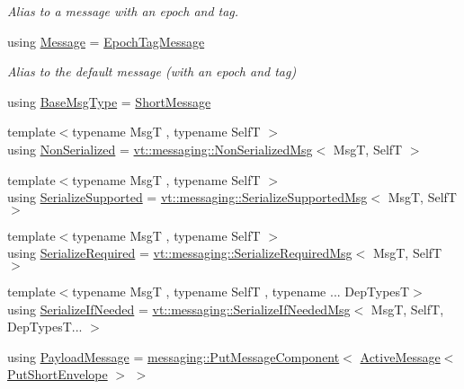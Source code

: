 \begin{DoxyCompactItemize}
\begin{DoxyCompactList}\small\item\em Alias to a message with an epoch and tag. \end{DoxyCompactList}\item 
using \hyperlink{namespacevt_a3a3ddfef40b4c90915fa43cdd5f129ea}{Message} = \hyperlink{namespacevt_a4ccc13b06bff8a4a35426a1a082a95a9}{Epoch\+Tag\+Message}
\begin{DoxyCompactList}\small\item\em Alias to the default message (with an epoch and tag) \end{DoxyCompactList}\item 
using \hyperlink{namespacevt_a44d0d4e144748f2b19a1cfd962f50338}{Base\+Msg\+Type} = \hyperlink{namespacevt_a1125ac1da6c0bbf141e0ea0739d7602d}{Short\+Message}
\item 
{\footnotesize template$<$typename MsgT , typename SelfT $>$ }\\using \hyperlink{namespacevt_a378e4a02213923b4ba1c3f9d2a1424c7}{Non\+Serialized} = \hyperlink{structvt_1_1messaging_1_1_non_serialized_msg}{vt\+::messaging\+::\+Non\+Serialized\+Msg}$<$ MsgT, SelfT $>$
\item 
{\footnotesize template$<$typename MsgT , typename SelfT $>$ }\\using \hyperlink{namespacevt_a3862b8e3f67ab03f3a4313d828592fa9}{Serialize\+Supported} = \hyperlink{structvt_1_1messaging_1_1_serialize_supported_msg}{vt\+::messaging\+::\+Serialize\+Supported\+Msg}$<$ MsgT, SelfT $>$
\item 
{\footnotesize template$<$typename MsgT , typename SelfT $>$ }\\using \hyperlink{namespacevt_a9e60e2e8929828639383ac1d6643384d}{Serialize\+Required} = \hyperlink{structvt_1_1messaging_1_1_serialize_required_msg}{vt\+::messaging\+::\+Serialize\+Required\+Msg}$<$ MsgT, SelfT $>$
\item 
{\footnotesize template$<$typename MsgT , typename SelfT , typename ... Dep\+TypesT$>$ }\\using \hyperlink{namespacevt_a0a4ad8c256fcffa564e9fa7800e4b495}{Serialize\+If\+Needed} = \hyperlink{structvt_1_1messaging_1_1_serialize_if_needed_msg}{vt\+::messaging\+::\+Serialize\+If\+Needed\+Msg}$<$ MsgT, SelfT, Dep\+Types\+T... $>$
\item 
using \hyperlink{namespacevt_a89a92229c5622b855c02c549f83a1a68}{Payload\+Message} = \hyperlink{structvt_1_1messaging_1_1_put_message_component}{messaging\+::\+Put\+Message\+Component}$<$ \hyperlink{namespacevt_a00eb67bd138395b6a4f744fab3fa0678}{Active\+Message}$<$ \hyperlink{namespacevt_a8d7a7de9e76bfea1600009a775b7298c}{Put\+Short\+Envelope} $>$ $>$

\end{DoxyCompactItemize}
